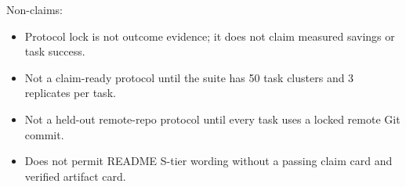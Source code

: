 \noindent Non-claims:
\begin{itemize}
\item Protocol lock is not outcome evidence; it does not claim measured savings or task success.
\item Not a claim-ready protocol until the suite has 50 task clusters and 3 replicates per task.
\item Not a held-out remote-repo protocol until every task uses a locked remote Git commit.
\item Does not permit README S-tier wording without a passing claim card and verified artifact card.
\end{itemize}
